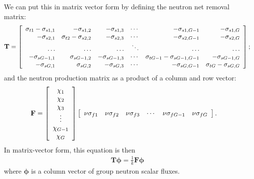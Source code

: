 We can put this in matrix vector form by defining the neutron net removal matrix:
\begin{align}
  \mathbf{T} = \left[ \begin{array}{r r r r r r}
  \sigma_{t1} - \sigma_{s1,1} &             - \sigma_{s1,2} &   -\sigma_{s1,3} & \cdots &              -\sigma_{s1,G-1}   &              - \sigma_{s1,G} \\ 
               -\sigma_{s2,1} & \sigma_{t2} - \sigma_{s2,2} &   -\sigma_{s2,3} & \cdots &              -\sigma_{s2,G-1}   &              - \sigma_{s2,G} \\ 
                       \ldots &                      \ldots &           \ldots & \ddots &                        \ldots   &                       \ldots \\ 
             -\sigma_{sG-1,1} &             \sigma_{sG-1,2} & -\sigma_{sG-1,3} & \cdots & \sigma_{tG-1}-\sigma_{sG-1,G-1} &            - \sigma_{sG-1,G} \\ 
               -\sigma_{sG,1} &               \sigma_{sG,2} &   -\sigma_{sG,3} & \cdots &              -\sigma_{sG,G-1}    & \sigma_{tG} - \sigma_{sG,G} \\ 
  \end{array} \right] ;
\end{align}
and the neutron production matrix as a product of a column and row vector:
\begin{align}
  \mathbf{F} &= 
  \left[ \begin{array}{c} \chi_1 \\ \chi_2 \\ \chi_3 \\ \vdots \\ \chi_{G-1} \\ \chi_G \\ \end{array} \right]
  \left[ \begin{array}{c c c c c c}
  \nu \sigma_{f1} & \nu \sigma_{f2} & \nu \sigma_{f3} & \cdots & \nu \sigma_{fG-1} & \nu \sigma_{fG} \\ \end{array} \right] .
\end{align}
In matrix-vector form, this equation is then
\begin{align}
  \mathbf{T} \boldsymbol\phi = \frac{1}{k} \mathbf{F} \boldsymbol\phi
\end{align}
where $\boldsymbol\phi$ is a column vector of group neutron scalar fluxes.

